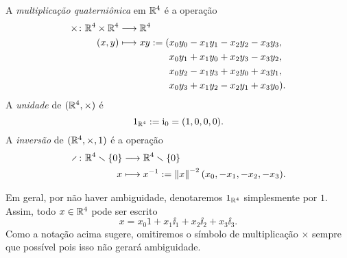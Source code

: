 \begin{definition}
A \emph{multiplicação quaterniônica} em $\mathbb{R}^4$ é a operação
	\begin{align*}
	\func{\times}{\R^4 \times \R^4}{\R^4}{(x,y)}{
		\begin{aligned}[t]
		xy := (&x_0y_0 - x_1y_1 - x_2y_2 - x_3y_3, \\
			&x_0y_1 + x_1y_0 + x_2y_3 - x_3y_2, \\
			&x_0y_2 - x_1y_3 + x_2y_0 + x_3y_1, \\
			&x_0y_3 + x_1y_2 - x_2y_1 + x_3y_0).
		\end{aligned}
	}
	\end{align*}
A \emph{unidade} de $(\mathbb{R}^4,\times)$ é
	\begin{equation*}
	1_{\mathbb{R}^4} := \mathrm{i}_0 = (1,0,0,0).
	\end{equation*}
A \emph{inversão} de $(\mathbb{R}^4,\times,1)$ é a operação
	\begin{align*}
	\func{\div}{\R^4 \setminus \{0\}}{\R^4 \setminus \{0\}}{x}{x\inv := \nor{x}^{-2} (x_0, -x_1, -x_2, -x_3)}.
	\end{align*}
\end{definition}

Em geral, por não haver ambiguidade, denotaremos $1_{\mathbb{R}^4}$ simplesmente por $1$. Assim, todo $x \in \mathbb{R}^4$ pode ser escrito
	\begin{equation*}
	x = x_0 1 + x_1\ii_1 + x_2\ii_2 + x_3\ii_3.
	\end{equation*}
Como a notação acima sugere, omitiremos o símbolo de multiplicação $\times$ sempre que possível pois isso não gerará ambiguidade.%

